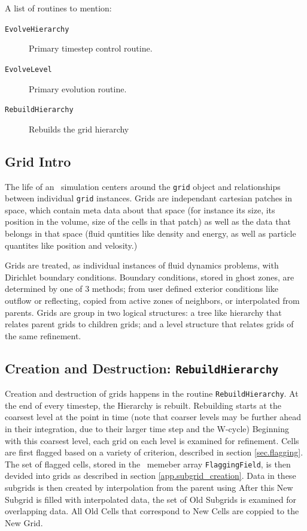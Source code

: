 A list of routines to mention: 
\begin{description}
 \item[\tt{EvolveHierarchy}] Primary timestep control routine. 
 \item[\tt{EvolveLevel}] Primary evolution routine.
 \item[\tt{RebuildHierarchy}] Rebuilds the grid hierarchy
\end{description}

\subsection{Grid Intro}
The life of an \enzo\ simulation centers around the {\tt grid}
object and relationships between individual {\tt grid} instances.  
Grids are independant cartesian patches in space, which contain meta data about
that space (for instance its size, its position in the volume, 
size of the cells in that patch) as well as the data that belongs in
that space (fluid quntities like density and energy, as well as
particle quantites like position and velosity.)

Grids are treated, as individual instances of fluid
dynamics problems, with Dirichlet boundary conditions.  Boundary
conditions, stored in ghost zones, are determined by
one of 3 methods; from user defined exterior conditions like
outflow or reflecting, copied from active zones of 
neighbors, or interpolated from parents.  Grids are group in two
logical structures: a tree like hierarchy that relates parent grids to
children grids; and a level structure that relates grids of the same
refinement.  

\subsection{Creation and Destruction: \tt{RebuildHierarchy}}
Creation and destruction of grids happens in the routine
{\tt RebuildHierarchy}.  
At the end of every timestep, the Hierarchy is rebuilt.
Rebuilding starts at the coarsest level at the point in time (note
that coarser levels may be further ahead in their integration, due to
their larger time step and the W-cycle)  Beginning with this coarsest level, each
grid on each level is examined for refinement.  Cells are first flagged
based on a variety of criterion, described in section
\ref{sec.flagging}.  The set of flagged cells, stored in the \grid\ memeber
array {\tt FlaggingField}, is then devided into grids as described
in section \ref{app.subgrid_creation}.  Data in these subgrids
is then created by interpolation from the parent using   After this New Subgrid is filled with
interpolated data, the set of Old Subgrids is examined for overlapping
data.  All Old Cells that correspond to New Cells are coppied to the
New Grid.

